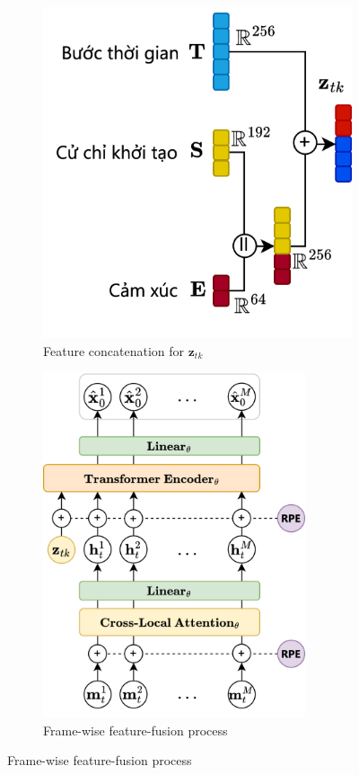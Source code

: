 \begin{figure}[h]
	\centering
	\begin{subfigure}{0.42\linewidth}
		\centering
		\includegraphics[width=0.9\linewidth]{images/FeatureConcatenate}
		\caption{Feature concatenation for $\mathbf{z}_{tk}$}
		\label{fig:FeatureFusion}
	\end{subfigure}
	\hfill
	\begin{subfigure}{0.55\linewidth}
		\centering
		\includegraphics[width=0.85\textwidth]{images/FeatureFusion}
		\caption{Frame-wise feature-fusion process}
		\label{fig:ZToken}
	\end{subfigure}
\end{figure}

